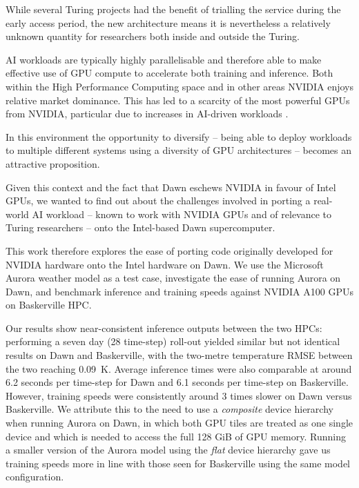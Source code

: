 While several Turing projects had the benefit of trialling the service during the early access period, the new architecture means it is nevertheless a relatively unknown quantity for researchers both inside and outside the Turing.

AI workloads are typically highly parallelisable and therefore able to make effective use of GPU compute to accelerate both training and inference. Both within the High Performance Computing space and in other areas NVIDIA enjoys relative market dominance. This has led to a scarcity of the most powerful GPUs from NVIDIA, particular due to increases in AI-driven workloads \cite{yoffie2024nvidia}.

In this environment the opportunity to diversify -- being able to deploy workloads to multiple different systems using a diversity of GPU architectures -- becomes an attractive proposition.

Given this context and the fact that Dawn eschews NVIDIA in favour of Intel GPUs, we wanted to find out about the challenges involved in porting a real-world AI workload -- known to work with NVIDIA GPUs and of relevance to Turing researchers -- onto the Intel-based Dawn supercomputer.

This work therefore explores the ease of porting code originally developed for NVIDIA hardware onto the Intel hardware on Dawn. We use the Microsoft Aurora weather model \cite{bodnar_foundation_2025} as a test case, investigate the ease of running Aurora on Dawn, and benchmark inference and training speeds against NVIDIA A100 GPUs on Baskerville HPC.

Our results show near-consistent inference outputs between the two HPCs: performing a seven day (28 time-step) roll-out yielded similar but not identical results on Dawn and Baskerville, with the two-metre temperature RMSE between the two reaching \qty{0.09}{\kelvin}. Average inference times were also comparable at around 6.2 seconds per time-step for Dawn and 6.1 seconds per time-step on Baskerville. However, training speeds were consistently around 3 times slower on Dawn versus Baskerville. We attribute this to the need to use a \textit{composite} device hierarchy when running Aurora on Dawn, in which both GPU tiles are treated as one single device and which is needed to access the full 128 GiB of GPU memory. Running a smaller version of the Aurora model using the \textit{flat} device hierarchy gave us training speeds more in line with those seen for Baskerville using the same model configuration.


